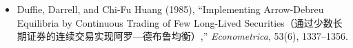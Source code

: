
\begin{itemize}

\item Duffie, Darrell, and Chi-Fu Huang (1985),
``Implementing Arrow-Debreu Equilibria by Continuous Trading of Few Long-Lived Securities（通过少数长期证券的连续交易实现阿罗—德布鲁均衡）,''
\emph{Econometrica}, 53(6), 1337--1356.

\end{itemize}

